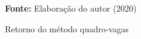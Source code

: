 \begin{figure}[ht!]
\centering

\caption{\textmd{Retorno do método quadro-vagas}}
\label{fig:retquadrovagas}

\par\medskip\textbf{Fonte:} Elaboração do autor (2020) \par\medskip

\end{figure}

